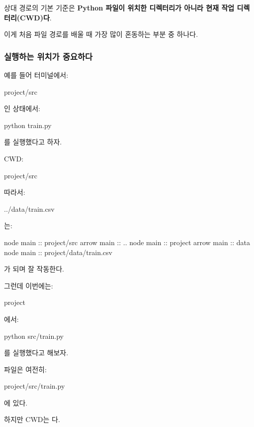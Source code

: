 상대 경로의 기본 기준은 \textbf{Python 파일이 위치한 디렉터리가 아니라 현재 작업 디렉터리(CWD)다}.

이게 처음 파일 경로를 배울 때 가장 많이 혼동하는 부분 중 하나다.

\subsubsection{실행하는 위치가 중요하다}

예를 들어 터미널에서:

\begin{dhkzsh}
project/src %
\end{dhkzsh}

인 상태에서:

\begin{dhkzsh}
python train.py
\end{dhkzsh}

를 실행했다고 하자.

CWD:

\begin{dhkzsh}
project/src
\end{dhkzsh}

따라서:

\begin{dhkzsh}
../data/train.csv
\end{dhkzsh}

는:
\begin{dhkbranch}[in=10]
node main :: project/src
arrow main :: ..
node main :: project
arrow main :: data
node main :: project/data/train.csv
\end{dhkbranch}


가 되며 잘 작동한다.

그런데 이번에는:

\begin{dhkzsh}
project %
\end{dhkzsh}

에서:

\begin{dhkzsh}
python src/train.py
\end{dhkzsh}

를 실행했다고 해보자.

 파일은 여전히:

\begin{dhkzsh}
project/src/train.py
\end{dhkzsh}

에 있다.

하지만 CWD는 다.

